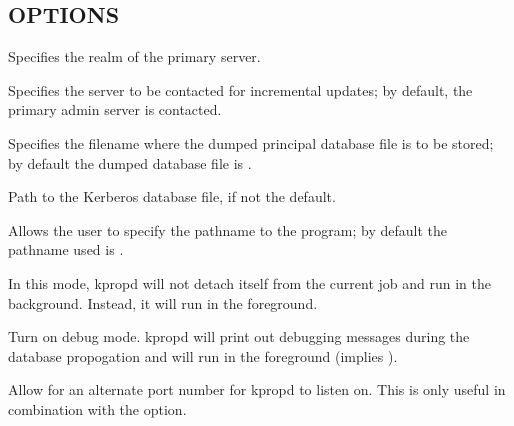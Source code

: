 \documentclass[letterpaper,10pt,english]{sphinxmanual}
\begin{document}
\subsection{OPTIONS}
\label{\detokenize{admin/admin_commands/kpropd:options}}\begin{description}
\sphinxAtStartPar
Specifies the realm of the primary server.

\sphinxAtStartPar
Specifies the server to be contacted for incremental updates; by
default, the primary admin server is contacted.

\sphinxAtStartPar
Specifies the filename where the dumped principal database file is
to be stored; by default the dumped database file is {\hyperref[\detokenize{mitK5defaults:paths}]{}}.

\sphinxAtStartPar
Path to the Kerberos database file, if not the default.

\sphinxAtStartPar
Allows the user to specify the pathname to the {\hyperref[\detokenize{admin/admin_commands/kdb5_util:kdb5-util-8}]{}}
program; by default the pathname used is {\hyperref[\detokenize{mitK5defaults:paths}]{}}.

\sphinxAtStartPar
In this mode, kpropd will not detach itself from the current job
and run in the background.  Instead, it will run in the
foreground.

\sphinxAtStartPar
Turn on debug mode.  kpropd will print out debugging messages
during the database propogation and will run in the foreground
(implies ).

\sphinxAtStartPar
Allow for an alternate port number for kpropd to listen on.  This
is only useful in combination with the  option.


\end{description}
\end{document}
